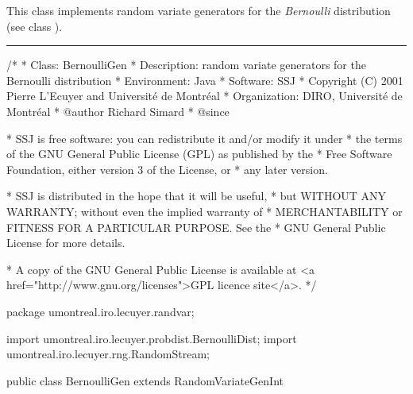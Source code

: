 
This class implements random variate generators for the 
{\em Bernoulli\/} distribution (see class
 ).


 
\bigskip\hrule

\begin{code}
\begin{hide}
/*
 * Class:        BernoulliGen
 * Description:  random variate generators for the Bernoulli distribution
 * Environment:  Java
 * Software:     SSJ 
 * Copyright (C) 2001  Pierre L'Ecuyer and Université de Montréal
 * Organization: DIRO, Université de Montréal
 * @author       Richard Simard
 * @since

 * SSJ is free software: you can redistribute it and/or modify it under
 * the terms of the GNU General Public License (GPL) as published by the
 * Free Software Foundation, either version 3 of the License, or
 * any later version.

 * SSJ is distributed in the hope that it will be useful,
 * but WITHOUT ANY WARRANTY; without even the implied warranty of
 * MERCHANTABILITY or FITNESS FOR A PARTICULAR PURPOSE.  See the
 * GNU General Public License for more details.

 * A copy of the GNU General Public License is available at
   <a href="http://www.gnu.org/licenses">GPL licence site</a>.
 */
\end{hide}
package umontreal.iro.lecuyer.randvar;\begin{hide}
import umontreal.iro.lecuyer.probdist.BernoulliDist;
import umontreal.iro.lecuyer.rng.RandomStream;\end{hide}

public class BernoulliGen extends RandomVariateGenInt \begin{hide} {
   protected double p;    
    
\end{hide}\end{code}

